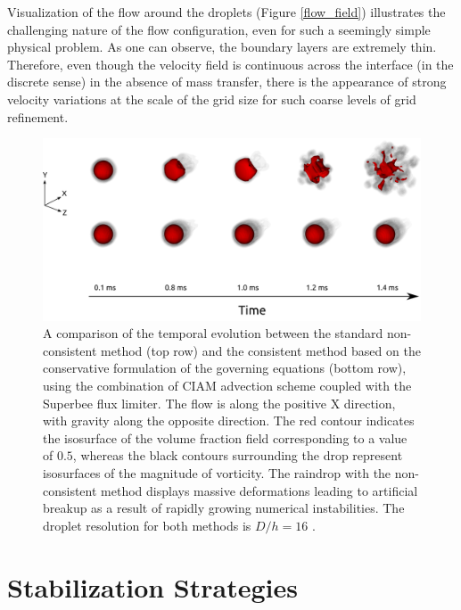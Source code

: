 Visualization of the flow around the droplets (Figure \ref{flow_field}) 
illustrates the challenging nature of the flow configuration, 
even for such a seemingly simple physical problem. 
As one can observe, the boundary layers are extremely thin. 
Therefore, even though the velocity field is continuous across the 
interface (in the discrete sense) in the absence of mass transfer, 
there is the appearance of strong velocity variations at the 
scale of the grid size for such coarse levels of grid refinement. 

\begin{figure}
\begin{center}
\includegraphics[width=1.25\textwidth]{plots/raindrop/raindrop_explode.png}
\end{center}
\caption{A comparison of the temporal evolution between the standard 
non-consistent method (top row) and the consistent method based on the 
conservative formulation of the governing equations (bottom row), 
using the combination of CIAM advection scheme coupled with the Superbee flux limiter. 
The flow is along the positive X direction, with gravity along the opposite direction. 
The red contour indicates the isosurface of the volume fraction 
field corresponding to a value of $0.5$, whereas the black contours 
surrounding the drop represent isosurfaces of the magnitude of vorticity. 
The raindrop with the non-consistent method displays massive deformations 
leading to artificial breakup as a result of rapidly growing numerical instabilities. 
The droplet resolution for both methods is $D/h = 16$ .}
\label{explode_compare}
\end{figure}



\section{Stabilization Strategies}

